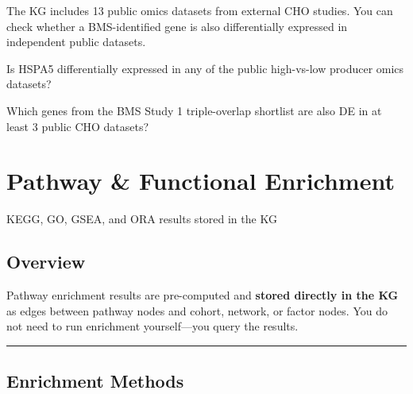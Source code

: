\documentclass[
  letterpaper,
  oneside,
  open=any]{scrbook}
\begin{document}
The KG includes 13 public omics datasets from external CHO studies. You
can check whether a BMS-identified gene is also differentially expressed
in independent public datasets.

Is HSPA5 differentially expressed in any of the public high-vs-low
producer omics datasets?

Which genes from the BMS Study 1 triple-overlap shortlist are also DE in
at least 3 public CHO datasets?


\chapter{Pathway \& Functional
Enrichment}\label{pathway-functional-enrichment}

KEGG, GO, GSEA, and ORA results stored in the KG

\hfill\break

\section{Overview}\label{sec-pathways}

Pathway enrichment results are pre-computed and \textbf{stored directly
in the KG} as edges between pathway nodes and cohort, network, or factor
nodes. You do not need to run enrichment yourself---you query the
results.

\begin{center}\rule{0.5\linewidth}{0.5pt}\end{center}

\section{Enrichment Methods}\label{enrichment-methods}
\end{document}
